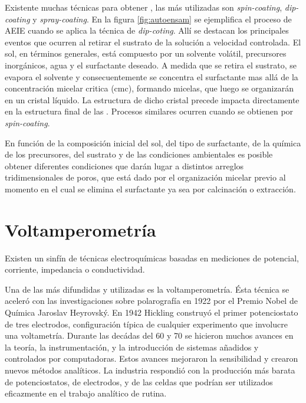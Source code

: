 	 Existente muchas técnicas para obtener \pdm\space, las más utilizadas son \textit{spin-coating}, \textit{dip-coating} y \textit{spray-coating}. En la figura \ref{fig:autoensam} se ejemplifica el proceso de AEIE cuando se aplica la técnica de \textit{dip-coting}. Allí se destacan los principales eventos que ocurren al retirar el sustrato de la solución a velocidad controlada. El sol, en términos generales, está compuesto por un solvente volátil, precursores inorgánicos, agua y el surfactante deseado. A medida que se retira el sustrato, se evapora el solvente y consecuentemente se concentra el surfactante mas allá de la concentración micelar critica (cmc), formando micelas, que luego se organizarán en un cristal líquido. La estructura de dicho cristal precede impacta directamente en la estructura final de las \pdm. Procesos similares ocurren cuando se obtienen \pdm\space por \textit{spin-coating}. 
 				
   	 En función de la composición inicial del sol, del tipo de surfactante, de la química de los precursores, del sustrato y de las condiciones ambientales es posible obtener diferentes condiciones que darán lugar a distintos arreglos tridimensionales de poros, que está dado por el organización micelar previo al momento en el cual se elimina el surfactante ya sea por calcinación o extracción.\cite{Grosso2004,Grosso2002,Crepaldi2002a,Grosso2003,Violi2015} 
	

\section{Voltamperometría}
					
		Existen un sinfín de técnicas electroquímicas basadas en mediciones de potencial, corriente, impedancia o conductividad.\cite{Wi2000,Bockris1974,koryta1993}

		Una de las más difundidas y utilizadas es la voltamperometría. Ésta técnica se aceleró con las investigaciones sobre polarografía en 1922 por el Premio Nobel de Química Jaroslav Heyrovský.\cite{Zuman1960} En 1942 Hickling construyó el primer potenciostato de tres electrodos, configuración típica de cualquier experimento que involucre una voltametría.\cite{hickling1942} Durante las decádas del 60 y 70 se hicieron muchos avances en la teoría, la instrumentación, y la introducción de sistemas añadidos y controlados por computadoras. Estos avances mejoraron la sensibilidad y crearon nuevos métodos analíticos. La industria respondió con la producción más barata de potenciostatos, de electrodos, y de las celdas que podrían ser utilizados eficazmente en el trabajo analítico de rutina.\cite{Wi2000}

